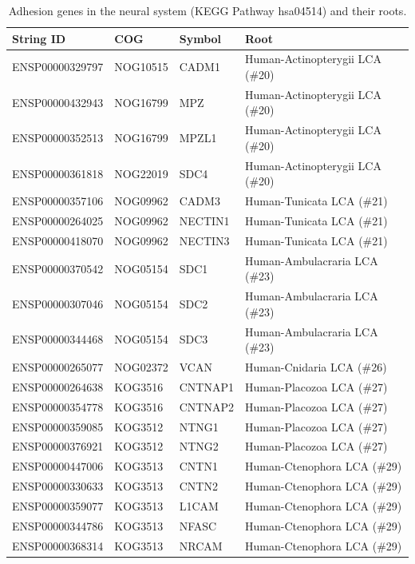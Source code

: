 \begin{longtable}[l]{llll}
\caption{\label{tab:unnamed-chunk-8}Adhesion genes in the neural system (KEGG Pathway hsa04514) and their roots.}\\
\toprule
String ID & COG & Symbol & Root\\
\midrule
\rowcolor{gray!6}  ENSP00000329797 & NOG10515 & CADM1 & Human-Actinopterygii LCA (\#20)\\
ENSP00000432943 & NOG16799 & MPZ & Human-Actinopterygii LCA (\#20)\\
\rowcolor{gray!6}  ENSP00000352513 & NOG16799 & MPZL1 & Human-Actinopterygii LCA (\#20)\\
ENSP00000361818 & NOG22019 & SDC4 & Human-Actinopterygii LCA (\#20)\\
\rowcolor{gray!6}  ENSP00000357106 & NOG09962 & CADM3 & Human-Tunicata LCA (\#21)\\
ENSP00000264025 & NOG09962 & NECTIN1 & Human-Tunicata LCA (\#21)\\
\rowcolor{gray!6}  ENSP00000418070 & NOG09962 & NECTIN3 & Human-Tunicata LCA (\#21)\\
ENSP00000370542 & NOG05154 & SDC1 & Human-Ambulacraria LCA (\#23)\\
\rowcolor{gray!6}  ENSP00000307046 & NOG05154 & SDC2 & Human-Ambulacraria LCA (\#23)\\
ENSP00000344468 & NOG05154 & SDC3 & Human-Ambulacraria LCA (\#23)\\
\rowcolor{gray!6}  ENSP00000265077 & NOG02372 & VCAN & Human-Cnidaria LCA (\#26)\\
ENSP00000264638 & KOG3516 & CNTNAP1 & Human-Placozoa LCA (\#27)\\
\rowcolor{gray!6}  ENSP00000354778 & KOG3516 & CNTNAP2 & Human-Placozoa LCA (\#27)\\
ENSP00000359085 & KOG3512 & NTNG1 & Human-Placozoa LCA (\#27)\\
\rowcolor{gray!6}  ENSP00000376921 & KOG3512 & NTNG2 & Human-Placozoa LCA (\#27)\\
ENSP00000447006 & KOG3513 & CNTN1 & Human-Ctenophora LCA (\#29)\\
\rowcolor{gray!6}  ENSP00000330633 & KOG3513 & CNTN2 & Human-Ctenophora LCA (\#29)\\
ENSP00000359077 & KOG3513 & L1CAM & Human-Ctenophora LCA (\#29)\\
\rowcolor{gray!6}  ENSP00000344786 & KOG3513 & NFASC & Human-Ctenophora LCA (\#29)\\
ENSP00000368314 & KOG3513 & NRCAM & Human-Ctenophora LCA (\#29)\\

\end{longtable}
